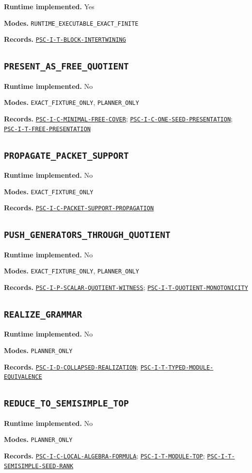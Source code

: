 \documentclass[a4paper,11pt]{article}
\newcommand{\field}[2]{\noindent\textbf{#1.} #2\par}
\begin{document}
\field{Runtime implemented}{Yes}
\field{Modes}{\nolinkurl{RUNTIME_EXECUTABLE_EXACT_FINITE}}
\field{Records}{\hyperref[rec:PSC-I-T-BLOCK-INTERTWINING]{\nolinkurl{PSC-I-T-BLOCK-INTERTWINING}}}
\subsection*{\nolinkurl{PRESENT_AS_FREE_QUOTIENT}}
\field{Runtime implemented}{No}
\field{Modes}{\nolinkurl{EXACT_FIXTURE_ONLY}, \nolinkurl{PLANNER_ONLY}}
\field{Records}{\hyperref[rec:PSC-I-C-MINIMAL-FREE-COVER]{\nolinkurl{PSC-I-C-MINIMAL-FREE-COVER}}; \hyperref[rec:PSC-I-C-ONE-SEED-PRESENTATION]{\nolinkurl{PSC-I-C-ONE-SEED-PRESENTATION}}; \hyperref[rec:PSC-I-T-FREE-PRESENTATION]{\nolinkurl{PSC-I-T-FREE-PRESENTATION}}}
\subsection*{\nolinkurl{PROPAGATE_PACKET_SUPPORT}}
\field{Runtime implemented}{No}
\field{Modes}{\nolinkurl{EXACT_FIXTURE_ONLY}}
\field{Records}{\hyperref[rec:PSC-I-C-PACKET-SUPPORT-PROPAGATION]{\nolinkurl{PSC-I-C-PACKET-SUPPORT-PROPAGATION}}}
\subsection*{\nolinkurl{PUSH_GENERATORS_THROUGH_QUOTIENT}}
\field{Runtime implemented}{No}
\field{Modes}{\nolinkurl{EXACT_FIXTURE_ONLY}, \nolinkurl{PLANNER_ONLY}}
\field{Records}{\hyperref[rec:PSC-I-P-SCALAR-QUOTIENT-WITNESS]{\nolinkurl{PSC-I-P-SCALAR-QUOTIENT-WITNESS}}; \hyperref[rec:PSC-I-T-QUOTIENT-MONOTONICITY]{\nolinkurl{PSC-I-T-QUOTIENT-MONOTONICITY}}}
\subsection*{\nolinkurl{REALIZE_GRAMMAR}}
\field{Runtime implemented}{No}
\field{Modes}{\nolinkurl{PLANNER_ONLY}}
\field{Records}{\hyperref[rec:PSC-I-D-COLLAPSED-REALIZATION]{\nolinkurl{PSC-I-D-COLLAPSED-REALIZATION}}; \hyperref[rec:PSC-I-T-TYPED-MODULE-EQUIVALENCE]{\nolinkurl{PSC-I-T-TYPED-MODULE-EQUIVALENCE}}}
\subsection*{\nolinkurl{REDUCE_TO_SEMISIMPLE_TOP}}
\field{Runtime implemented}{No}
\field{Modes}{\nolinkurl{PLANNER_ONLY}}
\field{Records}{\hyperref[rec:PSC-I-C-LOCAL-ALGEBRA-FORMULA]{\nolinkurl{PSC-I-C-LOCAL-ALGEBRA-FORMULA}}; \hyperref[rec:PSC-I-T-MODULE-TOP]{\nolinkurl{PSC-I-T-MODULE-TOP}}; \hyperref[rec:PSC-I-T-SEMISIMPLE-SEED-RANK]{\nolinkurl{PSC-I-T-SEMISIMPLE-SEED-RANK}}}
\end{document}
